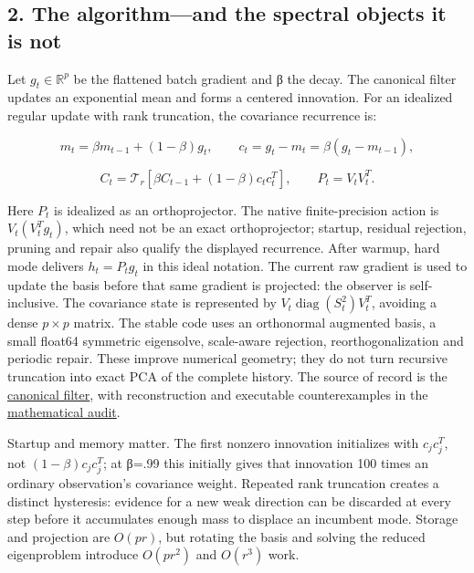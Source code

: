 \documentclass[
  british,
  10pt,
  a4paper,
]{article}
\begin{document}
\subsection{2. The algorithm---and the spectral objects it is
not}\label{synthesis--the-algorithmand-the-spectral-objects-it-is-not}

Let \(g_t\in\mathbb R^p\) be the flattened batch gradient and β the
decay. The canonical filter updates an exponential mean and forms a
centered innovation.\allowbreak{} For an idealized regular update with
rank truncation,\allowbreak{} the covariance recurrence is:

\[
m_t=\beta m_{t-1}+(1-\beta)g_t,\qquad
c_t=g_t-m_t=\beta(g_t-m_{t-1}),
\]

\[
C_t=\mathcal T_r\!\left[\beta C_{t-1}
 +(1-\beta)c_tc_t^T\right],\qquad P_t=V_tV_t^T.
\]

Here \(P_t\) is idealized as an
orthoproject\allowbreak{}or.\allowbreak{} The native
finite-\allowbreak{}precision action is \(V_t(V_t^Tg_t)\), which need
not be an exact orthoprojector; startup, residual rejection, pruning and
repair also qualify the displayed recurrence.\allowbreak{} After warmup,
hard mode delivers \(h_t=P_tg_t\) in this ideal notation. The current
raw gradient is used to update the basis before that same gradient is
projected: the observer is self-\allowbreak{}inclusive.\allowbreak{} The
covariance state is represented by
\(V_t\operatorname{diag}(S_t^2)V_t^T\), avoiding a dense \(p\times p\)
matrix. The stable code uses an orthonormal augmented basis, a small
float64 symmetric eigensolve,\allowbreak{} scale-\allowbreak{}aware
rejection, reorthogonalization and periodic repair. These improve
numerical geometry; they do not turn recursive truncation into exact PCA
of the complete history. The source of record is the
\href{../../../spectral_filter.py}{canonical filter}, with
reconstruction and executable counterexamples in the
\href{../analysis/mathematical-audit.md}{mathematical audit}.

Startup and memory matter. The first nonzero innovation initializes with
\(c_jc_j^T\), not \((1-\beta)c_jc_j^T\); at β=.99 this initially gives
that innovation 100 times an ordinary observation's covariance weight.
Repeated rank truncation creates a distinct hysteresis: evidence for a
new weak direction can be discarded at every step before it accumulates
enough mass to displace an incumbent mode. Storage and projection are
\(O(pr)\), but rotating the basis and solving the reduced eigenproblem
introduce \(O(pr^2)\) and \(O(r^3)\) work.
\end{document}
